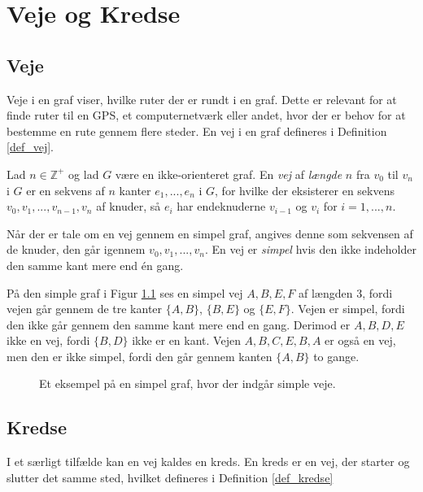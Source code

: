 \chapter{Veje og Kredse}

\section{Veje}
Veje i en graf viser, hvilke ruter der er rundt i en graf. Dette er relevant for at finde ruter til en GPS, et computernetværk eller andet, hvor der er behov for at bestemme en rute gennem flere steder. 
En vej i en graf defineres i Definition \ref{def_vej}.

\begin{defn} \label{def_vej}
	Lad $n \in  \mathbb{Z}^{+}$ og lad $G$ være en ikke-orienteret graf. 
	En \textit{vej} af \textit{længde} $n$ fra $v_0$ til $v_n$ i $G$ er en sekvens af $n$ kanter $e_1, ..., e_n$ i $G$, for hvilke der eksisterer en sekvens $v_0,v_1,...,v_{n-1},v_n$ af knuder, så $e_i$ har endeknuderne $v_{i-1}$ og $v_i$ for $i=1,...,n$.
\end{defn}

Når der er tale om en vej gennem en simpel graf, angives denne som sekvensen af de knuder, den går igennem $v_0, v_1,...,v_n$. 
En vej er \textit{simpel} hvis den ikke indeholder den samme kant mere end én gang. 

\begin{exmp} \label{ex_vej}
	På den simple graf i Figur \ref{graf_vej} ses en simpel vej $A,B,E,F$ af længden 3, fordi vejen går gennem de tre kanter $\lbrace A,B \rbrace$, $\lbrace B,E \rbrace$ og $\lbrace E,F \rbrace$. 
	Vejen er simpel, fordi den ikke går gennem den samme kant mere end en gang. 
	Derimod er $A,B,D,E$ ikke en vej, fordi $\lbrace B,D \rbrace$ ikke er en kant. 
	Vejen $A,B,C,E,B,A$ er også en vej, men den er ikke simpel, fordi den går gennem kanten $\lbrace A,B \rbrace$ to gange. 
\end{exmp}

\begin{figure}[h]
	\centering
	
	\caption{Et eksempel på en simpel graf, hvor der indgår simple veje.} \label{graf_vej}
\end{figure}

\section{Kredse}
I et særligt tilfælde kan en vej kaldes en kreds.
En kreds er en vej, der starter og slutter det samme sted, hvilket defineres i Definition \ref{def_kredse}

